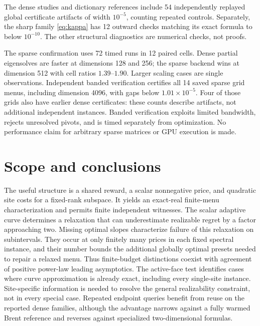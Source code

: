 \documentclass[11pt]{article}
\begin{document}
The dense studies and dictionary references include 54 independently
replayed global certificate artifacts of width $10^{-5}$, counting repeated
controls. Separately, the sharp family \eqref{eq:kappa} has 12 outward
checks matching its exact formula to below $10^{-10}$. The other structural
diagnostics are numerical checks, not proofs.

The sparse confirmation uses 72 timed runs in 12 paired cells. Dense
partial eigensolves are faster at dimensions 128 and 256; the sparse
backend wins at dimension 512 with cell ratios $1.39$--$1.90$. Larger
scaling cases are single observations. Independent banded verification
certifies all 14 saved sparse grid menus, including dimension 4096, with
gaps below $1.01\times10^{-5}$. Four of those grids also have earlier
dense certificates: these counts describe artifacts, not additional
independent instances. Banded verification exploits limited bandwidth,
rejects unresolved pivots, and is timed separately from optimization.
No performance claim for arbitrary sparse matrices or GPU execution is made.

\section{Scope and conclusions}
The useful structure is a shared reward, a scalar nonnegative price, and
quadratic site costs for a fixed-rank subspace. It yields an exact-real
finite-menu characterization and permits finite independent witnesses.
The scalar adaptive curve determines a relaxation that can underestimate
realizable regret by a factor approaching two. Missing optimal slopes
characterize failure of this relaxation on subintervals. They occur at
only finitely many prices in each fixed spectral instance, and their
number bounds the additional globally optimal presets needed to repair
a relaxed menu. Thus finite-budget distinctions coexist with agreement
of positive power-law leading asymptotics. The active-face test identifies
cases where curve approximation is already exact, including every
single-site instance. Site-specific information is needed to resolve
the general realizability constraint, not in every special case.
Repeated endpoint queries benefit from reuse on the reported dense families,
although the advantage narrows against a fully warmed Brent reference and
reverses against specialized two-dimensional formulas.
\end{document}
